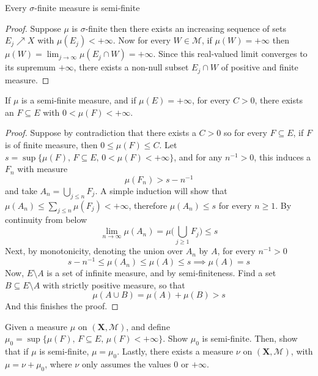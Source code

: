 \documentclass[../../main.tex]{subfiles}
\begin{document}
\newpage
{}
\begin{wts}
Every $\sigma$-finite measure is semi-finite
\end{wts}
\begin{proof}
    Suppose $\mu$ is $\sigma$-finite then there exists an increasing sequence of sets $E_j\nearrow X$ with $\mu(E_j)<+\infty$. Now for every $W\in\mathcal{M}$, if $\mu(W)=+\infty$ then $\mu(W)=\lim_{j\to\infty}\mu(E_j\cap W)=+\infty$. Since this real-valued limit converges to its supremum $+\infty$, there exists a non-null subset $E_j\cap W$ of positive and finite measure.
\end{proof}

\newpage

\begin{wts}
If $\mu$ is a semi-finite measure, and if $\mu(E)=+\infty$, for every $C>0$, there exists an $F\subseteq E$ with $0<\mu(F)<+\infty$.
\end{wts}
\begin{proof}
    Suppose by contradiction that there exists a $C>0$ so for every $F\subseteq E$, if $F$ is of finite measure, then $0\leq \mu(F)\leq C$. Let $s = \sup\{\mu(F),\,F\subseteq E,\, 0<\mu(F)<+\infty\}$, and for any $n^{-1}>0$, this induces a $F_n$ with measure
    \[
    \mu(F_n)>s-n^{-1}
    \] 
    and take $A_n = \bigcup_{j\leq n}F_j$. A simple induction will show that $\mu(A_n)\leq \sum_{j\leq n} \mu(F_j)<+\infty$, therefore $\mu(A_n)\leq s$ for every $n\geq 1$. By continuity from below
    \[
    \lim_{n\to\infty}\mu(A_n)=\mu\biggl(\bigcup_{j\geq 1}F_j\biggr)\leq s
    \]
    Next, by monotonicity, denoting the union over $A_n$ by $A$, for every $n^{-1}>0$
    \[
    s-n^{-1}\leq\mu(A_n)\leq\mu(A)\leq s\implies \mu(A)=s
    \]
    Now, $E\setminus A$ is a set of infinite measure, and by semi-finiteness. Find a set $B\subseteq E\setminus A$ with strictly positive measure, so that 
    \[
    \mu(A\cup B)=\mu(A)+\mu(B)>s
    \]
And this finishes the proof.
\end{proof}
\newpage
{}
\providecommand{\xx}{\mathbf{X}}
\providecommand{\calm}{\mathcal{M}}
\begin{wts}
    Given a measure $\mu$ on $(\xx,\calm)$, and define $\mu_0 = \sup\{\mu(F),\, F\subseteq E,\, \mu(F)<+\infty\}$. Show $\mu_0$ is semi-finite. Then, show that if $\mu$ is semi-finite, $\mu=\mu_0$. Lastly, there exists a measure $\nu$ on $(\xx,\calm)$, with $\mu = \nu + \mu_0$, where $\nu$ only assumes the values $0$ or $+\infty$.
\end{wts}
\end{document}

